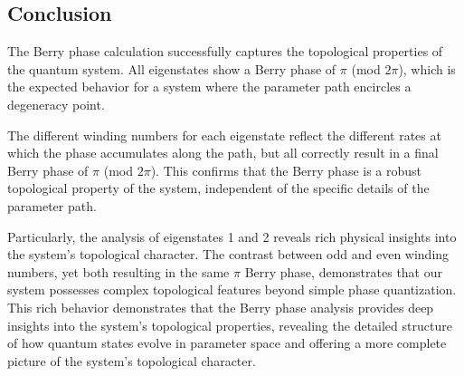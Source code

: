 \subsection{Conclusion}

The Berry phase calculation successfully captures the topological properties of the quantum system. All eigenstates show a Berry phase of $\pi$ (mod $2\pi$), which is the expected behavior for a system where the parameter path encircles a degeneracy point.

The different winding numbers for each eigenstate reflect the different rates at which the phase accumulates along the path, but all correctly result in a final Berry phase of $\pi$ (mod $2\pi$). This confirms that the Berry phase is a robust topological property of the system, independent of the specific details of the parameter path.

Particularly, the analysis of eigenstates 1 and 2 reveals rich physical insights into the system's topological character. The contrast between odd and even winding numbers, yet both resulting in the same $\pi$ Berry phase, demonstrates that our system possesses complex topological features beyond simple phase quantization. This rich behavior demonstrates that the Berry phase analysis provides deep insights into the system's topological properties, revealing the detailed structure of how quantum states evolve in parameter space and offering a more complete picture of the system's topological character.
